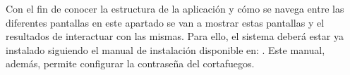 Con el fin de conocer la estructura de la aplicación y cómo se navega entre las diferentes pantallas en este apartado se van a mostrar estas pantallas y el resultados de interactuar con las mismas. Para ello, el sistema deberá estar ya instalado siguiendo el manual de instalación disponible en:  . Este manual, además, permite configurar la contraseña del cortafuegos.